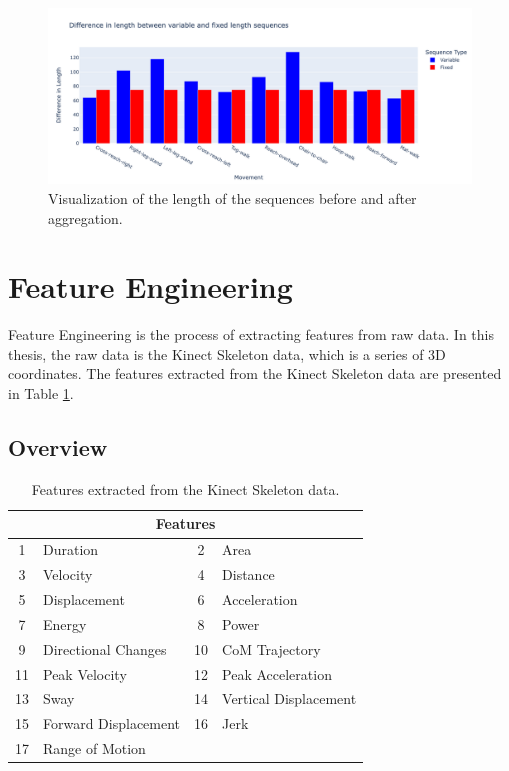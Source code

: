 \begin{figure}[H]
    \centering
    \includegraphics[width=1.0\textwidth]{../src/resources/plots/length.png}
    \caption{
        Visualization of the length of the sequences before and after aggregation.
    }
    \label{fig:seqlength}
\end{figure}

    \newpage
    
    \section{Feature Engineering} \label{sec:feature_engineering}
        Feature Engineering is the process of extracting features from raw data. In this thesis, the raw data is the Kinect Skeleton data, which is a series of 3D coordinates. The features extracted from the Kinect Skeleton data are presented in Table \ref{tab:features_table}.

        \subsection{Overview}
        \begin{table}[ht]
            \centering
            \begin{tabular}{@{}clcl@{}}
                \toprule
                \multicolumn{4}{c}{\textbf{Features}} \\
                \midrule
                1 & Duration & 2 & Area \\
                3 & Velocity & 4 & Distance \\
                5 & Displacement & 6 & Acceleration \\
                7 & Energy & 8 & Power  \\
                9 & Directional Changes & 10 & CoM Trajectory  \\
                11 & Peak Velocity  & 12 & Peak Acceleration  \\
                13 & Sway  & 14 & Vertical Displacement  \\
                15 & Forward Displacement & 16 & Jerk \\
                17 & Range of Motion \\
                \bottomrule
            \end{tabular}
            \caption{Features extracted from the Kinect Skeleton data.}
            \label{tab:features_table}
        \end{table}

